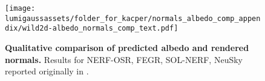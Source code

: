 
\begin{figure}[t]
  \centering
  \texttt{[image: \\lumigaussassets/folder\_for\_kacper/normals\_albedo\_comp\_appendix/wild2d-albedo\_normals\_comp\_text.pdf]}
  \caption{ \textbf{Qualitative comparison of predicted albedo and rendered normals.}
    Results for NERF-OSR, FEGR, SOL-NERF, NeuSky reported originally in
    \cite{gardner2023neusky}.
  }
  \label{fig:lumigauss-qual_normal_albedo_appendix}
\end{figure}